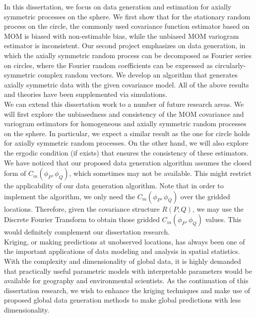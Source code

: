 %
%

In this dissertation, we focus on data generation and estimation for axially symmetric processes on the sphere. We first show that for the stationary random process on the circle, the commonly used covariance function estimator based on MOM is biased with non-estimable bias, while the unbiased MOM variogram estimator is inconsistent. Our second project emphasizes on data generation, in which the axially symmetric random process can be decomposed as Fourier series on circles, where the Fourier random coefficients can be expressed as circularly-symmetric complex random vectors. We develop an algorithm that generates axially symmetric data with the given covariance model. All of the above results and theories have been supplemented via simulations. \\

We can extend this dissertation work to a number of future research areas. We will first explore the unbiasedness and consistency of the MOM covariance and variogram estimators for homogeneous and axially symmetric random processes on the sphere. In particular, we expect a similar result as the one for circle holds for axially symmetric random processes. On the other hand, we will also explore the ergodic condition (if exists) that ensures the consistency of these estimators.\\

We have noticed that our proposed data generation algorithm assumes the closed form of $C_m(\phi_P, \phi_Q)$, which sometimes may not be available. This might restrict the applicability of our data generation algorithm. Note that in order to implement the algorithm, we only need the $C_m(\phi_P, \phi_Q)$ over the gridded locations. Therefore, given the covariance structure $R(P, Q)$, we may use the Discrete Fourier Transform to obtain those gridded $C_m(\phi_P, \phi_Q)$ values. This would definitely complement our dissertation research.\\

Kriging, or making predictions at unobserved locations, has always been one of the important applications of data modeling and analysis in spatial statistics. With the complexity and dimensionality of global data, it is highly demanded that practically useful parametric models with interpretable parameters would be available for geography and environmental scientists. As the continuation of this dissertation research, we wish to enhance the kriging techniques and make use of proposed global data generation methods to make global predictions with less dimensionality.

%